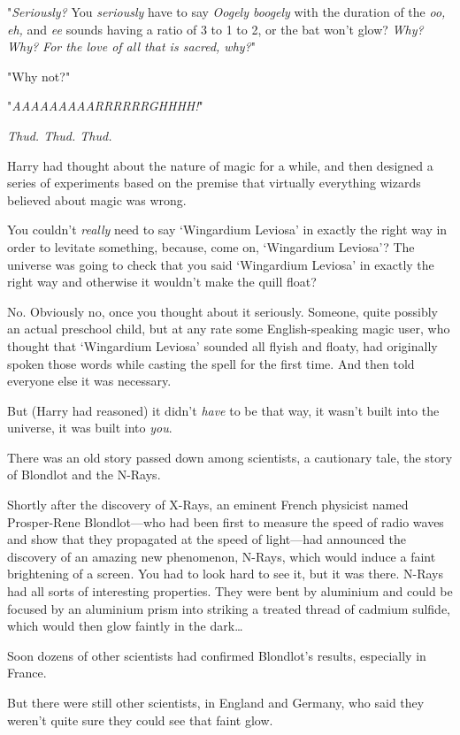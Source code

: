"\emph{Seriously?} You \emph{seriously} have to say \emph{Oogely boogely} with 
the duration of the \emph{oo, eh,} and \emph{ee} sounds having a ratio of 3 to 
1 to 2, or the bat won't glow? \emph{Why? Why? For the love of all that is 
sacred, why?}"

"Why not?"

"\emph{AAAAAAAAARRRRRRGHHHH!}"

\emph{Thud. Thud. Thud.}

Harry had thought about the nature of magic for a while, and then designed a 
series of experiments based on the premise that virtually everything wizards 
believed about magic was wrong.

You couldn't \emph{really} need to say `Wingardium Leviosa' in exactly the 
right way in order to levitate something, because, come on, `Wingardium 
Leviosa'? The universe was going to check that you said `Wingardium Leviosa' in 
exactly the right way and otherwise it wouldn't make the quill float?

No. Obviously no, once you thought about it seriously. Someone, quite possibly 
an actual preschool child, but at any rate some English-speaking magic user, 
who thought that `Wingardium Leviosa' sounded all flyish and floaty, had 
originally spoken those words while casting the spell for the first time. And 
then told everyone else it was necessary.

But (Harry had reasoned) it didn't \emph{have} to be that way, it wasn't built 
into the universe, it was built into \emph{you}.

There was an old story passed down among scientists, a cautionary tale, the 
story of Blondlot and the N-Rays.

Shortly after the discovery of X-Rays, an eminent French physicist named 
Prosper-Rene Blondlot---who had been first to measure the speed of radio waves 
and show that they propagated at the speed of light---had announced the 
discovery of an amazing new phenomenon, N-Rays, which would induce a faint 
brightening of a screen. You had to look hard to see it, but it was there. 
N-Rays had all sorts of interesting properties. They were bent by aluminium and 
could be focused by an aluminium prism into striking a treated thread of 
cadmium sulfide, which would then glow faintly in the dark{\ldots}

Soon dozens of other scientists had confirmed Blondlot's results, especially in 
France.

But there were still other scientists, in England and Germany, who said they 
weren't quite sure they could see that faint glow.

